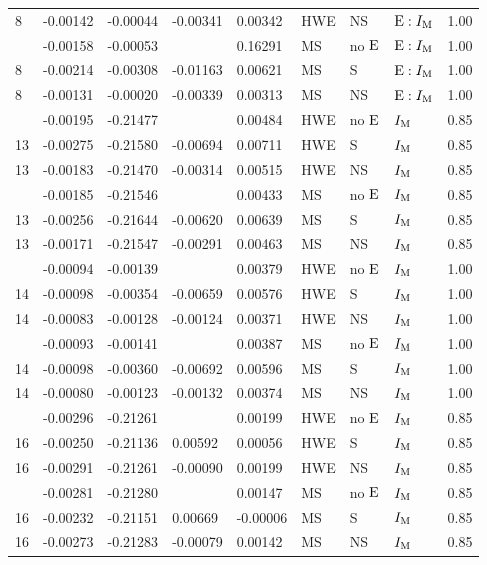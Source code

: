 \begin{longtable}[t]{lllllllll}
8 & -0.00142 & -0.00044 & -0.00341 & 0.00342 & HWE & NS & ${\rm E}:I_{{\rm M}}$ & 1.00\\
\addlinespace
8 & -0.00158 & -0.00053 &  & 0.16291 & MS & no ${\rm E}$ & ${\rm E}:I_{{\rm M}}$ & 1.00\\
8 & -0.00214 & -0.00308 & -0.01163 & 0.00621 & MS & S & ${\rm E}:I_{{\rm M}}$ & 1.00\\
8 & -0.00131 & -0.00020 & -0.00339 & 0.00313 & MS & NS & ${\rm E}:I_{{\rm M}}$ & 1.00\\
\addlinespace
13 & -0.00195 & -0.21477 &  & 0.00484 & HWE & no ${\rm E}$ & $I_{{\rm M}}$ & 0.85\\
13 & -0.00275 & -0.21580 & -0.00694 & 0.00711 & HWE & S & $I_{{\rm M}}$ & 0.85\\
13 & -0.00183 & -0.21470 & -0.00314 & 0.00515 & HWE & NS & $I_{{\rm M}}$ & 0.85\\
\addlinespace
13 & -0.00185 & -0.21546 &  & 0.00433 & MS & no ${\rm E}$ & $I_{{\rm M}}$ & 0.85\\
13 & -0.00256 & -0.21644 & -0.00620 & 0.00639 & MS & S & $I_{{\rm M}}$ & 0.85\\
13 & -0.00171 & -0.21547 & -0.00291 & 0.00463 & MS & NS & $I_{{\rm M}}$ & 0.85\\
\addlinespace
14 & -0.00094 & -0.00139 &  & 0.00379 & HWE & no ${\rm E}$ & $I_{{\rm M}}$ & 1.00\\
14 & -0.00098 & -0.00354 & -0.00659 & 0.00576 & HWE & S & $I_{{\rm M}}$ & 1.00\\
14 & -0.00083 & -0.00128 & -0.00124 & 0.00371 & HWE & NS & $I_{{\rm M}}$ & 1.00\\
\addlinespace
14 & -0.00093 & -0.00141 &  & 0.00387 & MS & no ${\rm E}$ & $I_{{\rm M}}$ & 1.00\\
14 & -0.00098 & -0.00360 & -0.00692 & 0.00596 & MS & S & $I_{{\rm M}}$ & 1.00\\
14 & -0.00080 & -0.00123 & -0.00132 & 0.00374 & MS & NS & $I_{{\rm M}}$ & 1.00\\
\addlinespace
16 & -0.00296 & -0.21261 &  & 0.00199 & HWE & no ${\rm E}$ & $I_{{\rm M}}$ & 0.85\\
16 & -0.00250 & -0.21136 & 0.00592 & 0.00056 & HWE & S & $I_{{\rm M}}$ & 0.85\\
16 & -0.00291 & -0.21261 & -0.00090 & 0.00199 & HWE & NS & $I_{{\rm M}}$ & 0.85\\
\addlinespace
16 & -0.00281 & -0.21280 &  & 0.00147 & MS & no ${\rm E}$ & $I_{{\rm M}}$ & 0.85\\
16 & -0.00232 & -0.21151 & 0.00669 & -0.00006 & MS & S & $I_{{\rm M}}$ & 0.85\\
16 & -0.00273 & -0.21283 & -0.00079 & 0.00142 & MS & NS & $I_{{\rm M}}$ & 0.85\\

\end{longtable}
